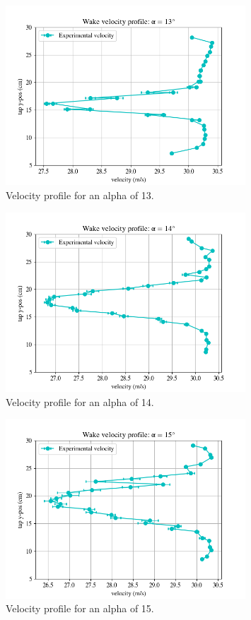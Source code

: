 \documentclass[11pt, letterpaper]{article}
\begin{document}
\begin{appendices}
\begin{figure}[!hpt]
        \centering        
        \includegraphics[width=0.8\textwidth]{Figures/vel-graphs/vel-a13.png}
        \caption{Velocity profile for an alpha of 13\degree.}
        \label{fig:vel-a13}
\end{figure}

\begin{figure}[!hpt]
        \centering        
        \includegraphics[width=0.8\textwidth]{Figures/vel-graphs/vel-a14.png}
        \caption{Velocity profile for an alpha of 14\degree.}
        \label{fig:vel-a14}
\end{figure}

\begin{figure}[!hpt]
        \centering        
        \includegraphics[width=0.8\textwidth]{Figures/vel-graphs/vel-a15.png}
        \caption{Velocity profile for an alpha of 15\degree.}
        \label{fig:vel-a15}
\end{figure}


\end{appendices}
\end{document}
